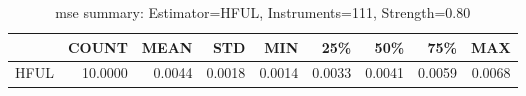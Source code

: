\begin{table}[ht]
\centering
\caption{mse summary: Estimator=HFUL, Instruments=111, Strength=0.80}
\begin{tabular}{lrrrrrrrr}
\toprule
 & COUNT & MEAN & STD & MIN & 25\% & 50\% & 75\% & MAX \\
\midrule
HFUL & 10.0000 & 0.0044 & 0.0018 & 0.0014 & 0.0033 & 0.0041 & 0.0059 & 0.0068 \\
\bottomrule
\end{tabular}
\end{table}
